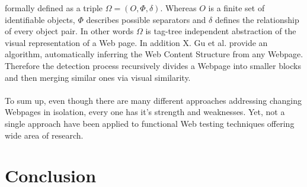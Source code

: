 \documentclass[12pt, notitlepage]{article}
\begin{document}
formally defined as a triple $\Omega=(O,\Phi, \delta)$. Whereas $O$ is a finite set of identifiable objects, $\Phi$ describes
possible separators and $\delta$ defines the relationship of every object pair. In other words $\Omega$ is tag-tree independent 
abstraction of the visual representation of a Web page. In addition X. Gu et al.\cite{understanding-web-adaption} provide
an algorithm, automatically inferring the Web Content Structure from any Webpage. Therefore the detection process recursively 
divides a Webpage into smaller blocks and then merging similar ones via visual similarity. \\\\
To sum up, even though there are many different approaches addressing changing Webpages in isolation, every one has it's strength
and weaknesses. Yet, not a single approach have been applied to functional Web testing techniques offering wide area of research.

\section*{Conclusion}


\newpage


\end{document}
